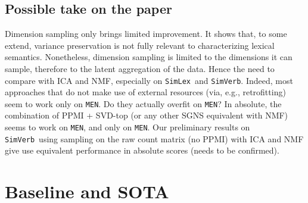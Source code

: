 \documentclass[utf8]{article}
\newcommand\men{\texttt{MEN}}
\newcommand\simlex{\texttt{SimLex}}
\newcommand\simverb{\texttt{SimVerb}}
\begin{document}
\subsection{Possible take on the paper}
Dimension sampling only brings limited improvement. It shows that, to some extend, variance preservation is not fully relevant to characterizing lexical semantics. Nonetheless, dimension sampling is limited to the dimensions it can sample, therefore to the latent aggregation of the data. Hence the need to compare with ICA and NMF, especially on \simlex\ and \simverb. Indeed, most approaches that do not make use of external resources (via, e.g., retrofitting) seem to work only on \men. Do they actually overfit on \men?
In absolute, the combination of PPMI + SVD-top (or any other SGNS equivalent with NMF) seems to work on \men, and only on \men. Our preliminary results on \simverb\ using sampling on the raw count matrix (no PPMI) with ICA and NMF give use equivalent performance in absolute scores (needs to be confirmed).


\section{Baseline and SOTA}

\begin{table}[H]
    \centering
    \caption{Baseline and SOTA}
\end{table}
\end{document}

